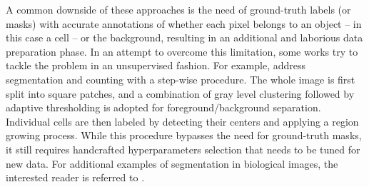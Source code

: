 A common downside of these approaches is  the need of ground-truth labels (or masks) with accurate annotations of whether each pixel belongs to an object -- in this case a cell -- or the background, resulting in an additional and laborious data preparation phase.
In an attempt to overcome this limitation, some works try to tackle the problem in an unsupervised fashion. For example,  address segmentation and counting with a step-wise procedure. The whole image is first split into square patches, and a combination of gray level clustering followed by adaptive thresholding is adopted for foreground/background separation. Individual cells are then labeled by detecting their centers and applying a region growing process. 
While this procedure bypasses the need for ground-truth masks, it still requires handcrafted hyperparameters selection that needs to be tuned for new data.
For additional examples of segmentation in biological images, the interested reader is referred to .

\newpage
